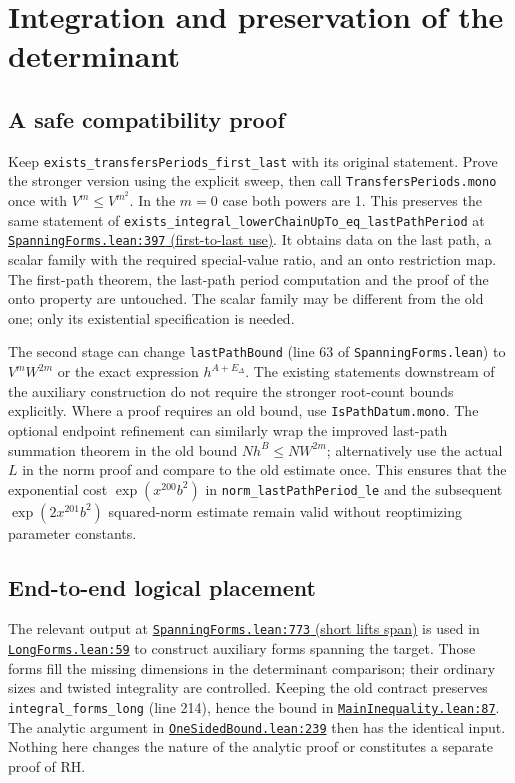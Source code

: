 \documentclass[11pt]{article}
\newcommand{\code}[1]{\texttt{#1}}
\newcommand{\base}{https://github.com/VladimirReshetnikov/ProveIt/blob/835c3695d07c0f77060c5cc63f92eeb52a7d21c2/Analysis/GeneralizedRiemannHypothesis}
\newcommand{\auxlink}[3]{\href{\base/Lean/grh/src/New/Determinant/AuxiliaryForms/#1.lean\#L#2}{\texttt{#1.lean:#2} (#3)}}
\begin{document}
\section{Integration and preservation of the determinant}
\subsection{A safe compatibility proof}
Keep \code{exists\_transfersPeriods\_first\_last} with its original statement. Prove the stronger version using the explicit sweep, then call \code{TransfersPeriods.mono} once with $V^m\le V^{m^2}$. In the $m=0$ case both powers are 1. This preserves the same statement of \code{exists\_integral\_lowerChainUpTo\_}\allowbreak\code{eq\_lastPathPeriod} at \auxlink{SpanningForms}{397}{first-to-last use}. It obtains data on the last path, a scalar family with the required special-value ratio, and an onto restriction map. The first-path theorem, the last-path period computation and the proof of the onto property are untouched. The scalar family may be different from the old one; only its existential specification is needed.

The second stage can change \code{lastPathBound} (line 63 of \texttt{SpanningForms.lean}) to $V^m W^{2m}$ or the exact expression $h^{A+E_\Delta}$. The existing statements downstream of the auxiliary construction do not require the stronger root-count bounds explicitly. Where a proof requires an old bound, use \code{IsPathDatum.mono}. The optional endpoint refinement can similarly wrap the improved last-path summation theorem in the old bound $Nh^B\le NW^{2m}$; alternatively use the actual $L$ in the norm proof and compare to the old estimate once. This ensures that the exponential cost $\exp(x^{200}b^2)$ in \code{norm\_lastPathPeriod\_le} and the subsequent $\exp(2x^{201}b^2)$ squared-norm estimate remain valid without reoptimizing parameter constants.

\subsection{End-to-end logical placement}
The relevant output at \auxlink{SpanningForms}{773}{short lifts span} is used in \href{\base/Lean/grh/src/New/Determinant/Twist/LongForms.lean\#L59}{\texttt{LongForms.lean:59}} to construct auxiliary forms spanning the target. Those forms fill the missing dimensions in the determinant comparison; their ordinary sizes and twisted integrality are controlled. Keeping the old contract preserves \texttt{integral\_forms\_long} (line 214), hence the bound in \href{\base/Lean/grh/src/New/Reduction/MainInequality.lean\#L87}{\texttt{MainInequality.lean:87}}. The analytic argument in \href{\base/Lean/grh/src/New/Reduction/OneSidedBound.lean\#L239}{\texttt{OneSidedBound.lean:239}} then has the identical input. Nothing here changes the nature of the analytic proof or constitutes a separate proof of RH.
\end{document}
